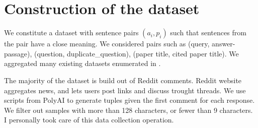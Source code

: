 \section{Construction of the dataset}

We constitute a dataset with sentence pairs $(a_i, p_i)$ such that sentences from the pair have a close meaning. We considered pairs such as (query, answer-passage), (question, duplicate\_question), (paper title, cited paper title). We aggregated many existing datasets enumerated in . 

The majority of the dataset is build out of Reddit comments. Reddit website aggregates news, and lets users post links and discuss trought threads. We use scripts from PolyAI to generate tuples given the first comment for each response. We filter out samples with more than 128 characters, or fewer than 9 characters. I personally took care of this data collection operation.

